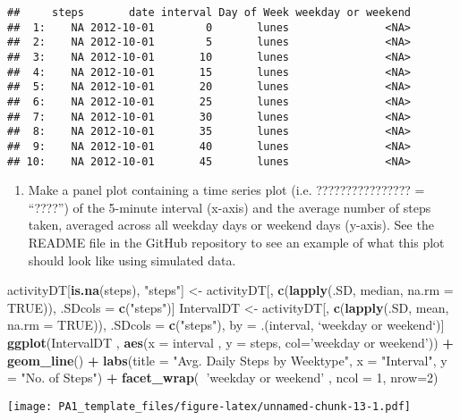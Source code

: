 \documentclass[]{article}
\newenvironment{Shaded}{\begin{snugshade}}{\end{snugshade}}
\newcommand{\KeywordTok}[1]{\textcolor[rgb]{0.13,0.29,0.53}{\textbf{#1}}}
\newcommand{\DataTypeTok}[1]{\textcolor[rgb]{0.13,0.29,0.53}{#1}}
\newcommand{\DecValTok}[1]{\textcolor[rgb]{0.00,0.00,0.81}{#1}}
\newcommand{\StringTok}[1]{\textcolor[rgb]{0.31,0.60,0.02}{#1}}
\newcommand{\OtherTok}[1]{\textcolor[rgb]{0.56,0.35,0.01}{#1}}
\newcommand{\OperatorTok}[1]{\textcolor[rgb]{0.81,0.36,0.00}{\textbf{#1}}}
\newcommand{\NormalTok}[1]{#1}
\providecommand{\tightlist}{%
  \setlength{\itemsep}{0pt}\setlength{\parskip}{0pt}}
\begin{document}
\begin{verbatim}
##     steps       date interval Day of Week weekday or weekend
##  1:    NA 2012-10-01        0       lunes               <NA>
##  2:    NA 2012-10-01        5       lunes               <NA>
##  3:    NA 2012-10-01       10       lunes               <NA>
##  4:    NA 2012-10-01       15       lunes               <NA>
##  5:    NA 2012-10-01       20       lunes               <NA>
##  6:    NA 2012-10-01       25       lunes               <NA>
##  7:    NA 2012-10-01       30       lunes               <NA>
##  8:    NA 2012-10-01       35       lunes               <NA>
##  9:    NA 2012-10-01       40       lunes               <NA>
## 10:    NA 2012-10-01       45       lunes               <NA>
\end{verbatim}

\begin{enumerate}
\def\labelenumi{\arabic{enumi}.}
\setcounter{enumi}{1}
\tightlist
\item
  Make a panel plot containing a time series plot (i.e. ????????????????
  = ``????'') of the 5-minute interval (x-axis) and the average number
  of steps taken, averaged across all weekday days or weekend days
  (y-axis). See the README file in the GitHub repository to see an
  example of what this plot should look like using simulated data.
\end{enumerate}

\begin{Shaded}
\begin{Highlighting}[]
\NormalTok{activityDT[}\KeywordTok{is.na}\NormalTok{(steps), }\StringTok{"steps"}\NormalTok{] <-}\StringTok{ }\NormalTok{activityDT[, }\KeywordTok{c}\NormalTok{(}\KeywordTok{lapply}\NormalTok{(.SD, median, }\DataTypeTok{na.rm =} \OtherTok{TRUE}\NormalTok{)), .SDcols =}\StringTok{ }\KeywordTok{c}\NormalTok{(}\StringTok{"steps"}\NormalTok{)]}
\NormalTok{IntervalDT <-}\StringTok{ }\NormalTok{activityDT[, }\KeywordTok{c}\NormalTok{(}\KeywordTok{lapply}\NormalTok{(.SD, mean, }\DataTypeTok{na.rm =} \OtherTok{TRUE}\NormalTok{)), .SDcols =}\StringTok{ }\KeywordTok{c}\NormalTok{(}\StringTok{"steps"}\NormalTok{), by =}\StringTok{ }\NormalTok{.(interval, }\StringTok{`}\DataTypeTok{weekday or weekend}\StringTok{`}\NormalTok{)] }
\KeywordTok{ggplot}\NormalTok{(IntervalDT , }\KeywordTok{aes}\NormalTok{(}\DataTypeTok{x =}\NormalTok{ interval , }\DataTypeTok{y =}\NormalTok{ steps, }\DataTypeTok{col=}\StringTok{'weekday or weekend'}\NormalTok{)) }\OperatorTok{+}\StringTok{ }\KeywordTok{geom_line}\NormalTok{() }\OperatorTok{+}\StringTok{ }\KeywordTok{labs}\NormalTok{(}\DataTypeTok{title =} \StringTok{"Avg. Daily Steps by Weektype"}\NormalTok{, }\DataTypeTok{x =} \StringTok{"Interval"}\NormalTok{, }\DataTypeTok{y =} \StringTok{"No. of Steps"}\NormalTok{) }\OperatorTok{+}\StringTok{ }\KeywordTok{facet_wrap}\NormalTok{(}\OperatorTok{~}\StringTok{'weekday or weekend'}\NormalTok{ , }\DataTypeTok{ncol =} \DecValTok{1}\NormalTok{, }\DataTypeTok{nrow=}\DecValTok{2}\NormalTok{)}
\end{Highlighting}
\end{Shaded}

\texttt{[image: PA1\_template\_files/figure-latex/unnamed-chunk-13-1.pdf]}
\end{document}
